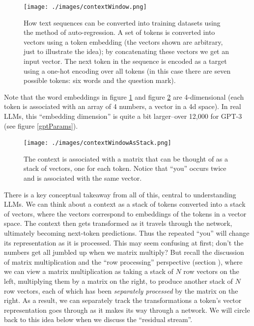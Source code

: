 \begin{figure}[ht]
\centering
\texttt{[image: ./images/contextWindow.png]}
\caption[Jeff Yoshimi]{How text sequences can be converted into training
datasets using the method of auto-regression. A set of tokens is converted into
vectors using a token embedding (the vectors shown are arbitrary, just to
illustrate the idea); by concatenating these vectors we get an input vector.
The next token in the sequence is encoded as a target using a one-hot encoding
over all tokens (in this case there are seven possible tokens: six words and
the question mark).}
\label{nextWordPrediction}
\end{figure}

Note that the word embeddings in figure \ref{nextWordPrediction} and figure
\ref{sequenceDim} are 4-dimensional (each token is associated with an array of
4 numbers, a vector in a 4d space). In real LLMs, this ``embedding dimension''
is quite a bit larger--over 12,000 for GPT-3 (see figure \ref{gptParams}).

\begin{figure}[ht]
\centering
\texttt{[image: ./images/contextWindowAsStack.png]}
\caption[Jeff Yoshimi]{The context is associated with a matrix that can
be thought of as a stack of vectors, one for each token. Notice that ``you''
occurs twice and is associated with the same vector.
}
\label{sequenceDim}
\end{figure}

There is a key conceptual takeaway from all of this, central to understanding
LLMs. We can think about a context as a stack of tokens converted into a stack
of vectors, where the vectors correspond to embeddings of the tokens in a
vector space. The context then gets transformed as it travels through the
network, ultimately becoming next-token predictions. Thus the repeated ``you''
will change its representation as it is processed. This may seem confusing at
first; don't the numbers get all jumbled up when we matrix multiply? But recall
the discussion of matrix multiplication and the ``row processing'' perspective
(section ), where we can view a matrix
multiplication as taking a stack of $N$ row vectors on the left, multiplying
them by a matrix on the right, to produce another stack of $N$ row
vectors, each of which has been \emph{separately processed} by the matrix on
the right. As a result, we can separately track the transformations a token's
vector representation goes through as it makes its way through a network.  We
will circle back to this idea below when we discuss the ``residual stream''.

